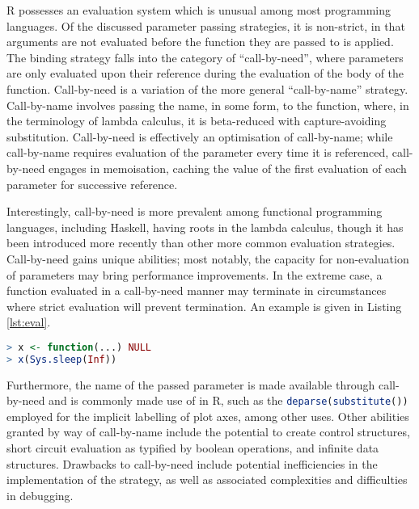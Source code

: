 \documentclass[10pt,a4paper]{article}
\begin{document}
R possesses an evaluation system which is unusual among most programming languages.
Of the discussed parameter passing strategies, it is non-strict, in that arguments are not evaluated before the function they are passed to is applied.
The binding strategy falls into the category of ``call-by-need'', where parameters are only evaluated upon their reference during the evaluation of the body of the function.
Call-by-need is a variation of the more general ``call-by-name'' strategy.
Call-by-name involves passing the name, in some form, to the function, where, in the terminology of lambda calculus, it is beta-reduced with capture-avoiding substitution.
Call-by-need is effectively an optimisation of call-by-name; while call-by-name requires evaluation of the parameter every time it is referenced, call-by-need engages in memoisation, caching the value of the first evaluation of each parameter for successive reference.

Interestingly, call-by-need is more prevalent among functional programming languages, including Haskell, having roots in the lambda calculus, though it has been introduced more recently than other more common evaluation strategies.
Call-by-need gains unique abilities; most notably, the capacity for non-evaluation of parameters may bring performance improvements.
In the extreme case, a function evaluated in a call-by-need manner may terminate in circumstances where strict evaluation will prevent termination.
An example is given in Listing \ref{lst:eval}.

\begin{lstlisting}[language=R,float,caption={Evaluation of this program will terminate under call-by-need but not terminate under strict evaluation},label=lst:eval]
> x <- function(...) NULL
> x(Sys.sleep(Inf))
\end{lstlisting}

Furthermore, the name of the passed parameter is made available through call-by-need and is commonly made use of in R, such as the \lstinline[language=R]{deparse(substitute())} employed for the implicit labelling of plot axes, among other uses.
Other abilities granted by way of call-by-name include the potential to create control structures, short circuit evaluation as typified by boolean operations, and infinite data structures.
Drawbacks to call-by-need include potential inefficiencies in the implementation of the strategy, as well as associated complexities and difficulties in debugging.
\end{document}
